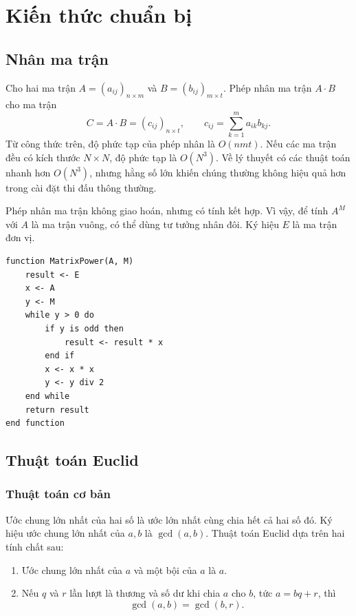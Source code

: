 \documentclass[11pt]{article}
\begin{document}
\section{Kiến thức chuẩn bị}

\subsection{Nhân ma trận}

Cho hai ma trận $A=(a_{ij})_{n\times m}$ và
$B=(b_{ij})_{m\times t}$. Phép nhân ma trận $A\cdot B$ cho ma trận
\[
  C=A\cdot B=(c_{ij})_{n\times t},\qquad
  c_{ij}=\sum_{k=1}^{m} a_{ik}b_{kj}.
\]
Từ công thức trên, độ phức tạp của phép nhân là $O(nmt)$. Nếu các ma trận đều
có kích thước $N\times N$, độ phức tạp là $O(N^3)$. Về lý thuyết có các thuật
toán nhanh hơn $O(N^3)$, nhưng hằng số lớn khiến chúng thường không hiệu quả
hơn trong cài đặt thi đấu thông thường.

Phép nhân ma trận không giao hoán, nhưng có tính kết hợp. Vì vậy, để tính
$A^M$ với $A$ là ma trận vuông, có thể dùng tư tưởng nhân đôi. Ký hiệu $E$ là
ma trận đơn vị.

\begin{lstlisting}
function MatrixPower(A, M)
    result <- E
    x <- A
    y <- M
    while y > 0 do
        if y is odd then
            result <- result * x
        end if
        x <- x * x
        y <- y div 2
    end while
    return result
end function
\end{lstlisting}

\subsection{Thuật toán Euclid}

\subsubsection{Thuật toán cơ bản}

Ước chung lớn nhất của hai số là ước lớn nhất cùng chia hết cả hai số đó. Ký
hiệu ước chung lớn nhất của $a,b$ là $\gcd(a,b)$. Thuật toán Euclid dựa trên
hai tính chất sau:
\begin{enumerate}[label=\alph*)]
  \item Ước chung lớn nhất của $a$ và một bội của $a$ là $a$.
  \item Nếu $q$ và $r$ lần lượt là thương và số dư khi chia $a$ cho $b$, tức
  $a=bq+r$, thì
  \[
    \gcd(a,b)=\gcd(b,r).
  \]
\end{enumerate}
\end{document}
